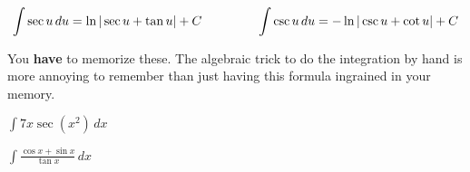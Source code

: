 \begin{tcolorbox}[title= INTEGRAL OF SECANT AND COSECANT,colframe=black,sharp corners,colback=white,colbacktitle=white,coltitle=black,boxrule=1pt]

    \[\displaystyle\int\sec u\,du=\ln|\sec u+\tan u|+C \hspace{.6in}\int\csc u\,du=-\ln|\csc u + \cot u|+C\]
    
\end{tcolorbox}
You \textbf{have} to memorize these. The algebraic trick to do the integration by hand is more annoying to remember than just having this formula ingrained in your memory.

\begin{questions}
    \question $\displaystyle \int 7x\sec(x^2)\,dx$
    
    
    \question $\displaystyle \int \frac{\cos x+\sin x}{\tan x}\,dx$
    
\end{questions}




\newpage
